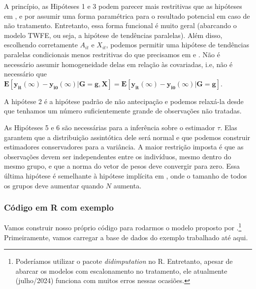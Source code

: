 \documentclass[portugues]{article}
\begin{document}
A princípio, as Hipóteses 1 e 3 podem parecer mais restritivas que as hipóteses em \cite{sun2021estimating}, \cite{callaway2021difference} e \cite{de2020two} por assumir uma forma paramétrica para o resultado potencial em caso de não tratamento. Entretanto, essa forma funcional é muito geral (abarcando o modelo TWFE, ou seja, a hipótese de tendências paralelas). Além disso, escolhendo corretamente $A_{it}$ e $X_{it}$, podemos permitir uma hipótese de tendências paralelas condicionais menos restritivas do que precisamos em \cite{sun2021estimating} e  \cite{de2020two}. Não é necessário assumir homogeneidade delas em relação às covariadas, i.e, não é necessário que $\mathbf{E[y_{it}(\infty) - y_{i0}(\infty) | G=g, X] = E[y_{it}(\infty) - y_{i0}(\infty)|G=g]}$.

A hipótese 2 é a hipótese padrão de não antecipação e podemos relaxá-la desde que tenhamos um número suficientemente grande de observações não tratadas. 

As Hipóteses 5 e 6 são necessárias para a inferência sobre o estimador $\tau$. Elas garantem que a distribuição assintótica dele será normal e que podemos construir estimadores conservadores para a variância. A maior restrição imposta é que as observações devem ser independentes entre os indivíduos, mesmo dentro do mesmo grupo, e que a norma do vetor de pesos deve convergir para zero. Essa última hipótese é semelhante à hipótese implícita em \citet{sun2021estimating}, onde o tamanho de todos os grupos deve aumentar quando $N$ aumenta.

\subsubsection{Código em R com exemplo}

Vamos construir nosso próprio código para rodarmos o modelo proposto por \cite{borusyak2024revisiting}.\footnote{Poderíamos utilizar o pacote \textit{didimputation} no R. Entretanto, apesar de abarcar os modelos com escalonamento no tratamento, ele atualmente (julho/2024) funciona com muitos erros nessas ocasiões.} Primeiramente, vamos carregar a base de dados do exemplo trabalhado até aqui.
\end{document}
